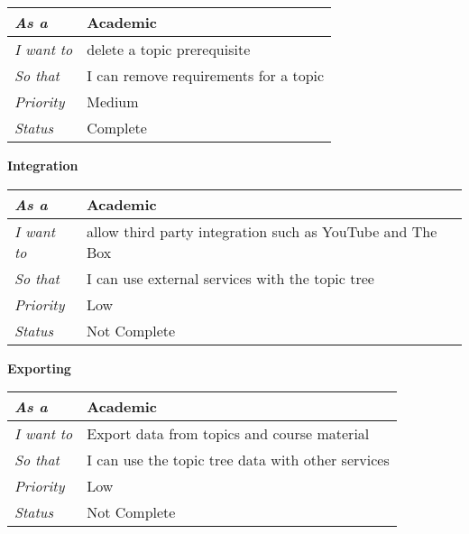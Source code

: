 \begin{table}[]
\begin{tabular}{|l|l|}
\hline
\textit{As a}      & Academic                                                                               \\ \hline
\textit{I want to} & delete a topic prerequisite                                                            \\ \hline
\textit{So that}   & I can remove requirements for a topic \\ \hline
\textit{Priority}  & {\color[HTML]{FE996B} Medium}                                                          \\ \hline
\textit{Status}    & Complete                                                                               \\ \hline
\end{tabular}
\end{table}

\textbf{Integration}

\begin{table}[]
\begin{tabular}{|l|l|}
\hline
\textit{As a}      & Academic                                                  \\ \hline
\textit{I want to} & allow third party integration such as YouTube and The Box \\ \hline
\textit{So that}   & I can use external services with the topic tree           \\ \hline
\textit{Priority}  & {\color[HTML]{3531FF} Low}                                \\ \hline
\textit{Status}    & Not Complete                                              \\ \hline
\end{tabular}
\end{table}

\textbf{Exporting}

\begin{table}[]
\begin{tabular}{|l|l|}
\hline
\textit{As a}      & Academic                                          \\ \hline
\textit{I want to} & Export data from topics and course material       \\ \hline
\textit{So that}   & I can use the topic tree data with other services \\ \hline
\textit{Priority}  & {\color[HTML]{3531FF} Low}                        \\ \hline
\textit{Status}    & Not Complete                                      \\ \hline
\end{tabular}
\end{table}

